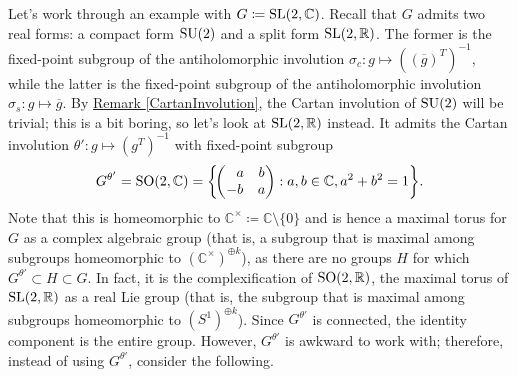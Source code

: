 \noindent\begin{example} %
Let's work through an example with $G \coloneqq \textup{SL}(2, \mathbb{C})$. Recall that $G$ admits two real forms: a compact form $\textup{SU}(2)$ and a split form $\textup{SL}(2, \mathbb{R})$. The former is the fixed-point subgroup of the antiholomorphic involution $\sigma_c : g \mapsto ((\overline{g})^T)^{-1}$, while the latter is the fixed-point subgroup of the antiholomorphic involution $\sigma_s : g \mapsto \overline{g}$. By \hyperref[CartanInvolution]{Remark \ref*{CartanInvolution}}, the Cartan involution of $\textup{SU}(2)$ will be trivial; this is a bit boring, so let's look at $\textup{SL}(2, \mathbb{R})$ instead. It admits the Cartan involution $\theta' : g \mapsto (g^T)^{-1}$ with fixed-point subgroup
\begin{align*}
\begin{split}
G^{\theta'} = \textup{SO}(2, \mathbb{C}) = \left\{\!\begin{pmatrix}\hphantom{-}a&b\\-b&a\end{pmatrix} : a, b \in \mathbb{C}, a^2 + b^2 = 1\right\}\!.
\end{split}
\end{align*}
\noindent Note that this is homeomorphic to $\mathbb{C}^\times \coloneqq \mathbb{C}\!\setminus\!\{0\}$ and is hence a maximal torus for $G$ as a complex algebraic group (that is, a subgroup that is maximal among subgroups homeomorphic to $(\mathbb{C}^\times)^{\oplus k}$), as there are no groups $H$ for which $G^{\theta'} \subset H \subset G$. In fact, it is the complexification of $\textup{SO}(2, \mathbb{R})$, the maximal torus of $\textup{SL}(2, \mathbb{R})$ as a real Lie group (that is, the subgroup that is maximal among subgroups homeomorphic to $(S^1)^{\oplus k}$). Since $G^{\theta'}$ is connected, the identity component is the entire group. However, $G^{\theta'}$ is awkward to work with; therefore, instead of using $G^{\theta'}$, consider the following.\newpage


\end{example}
